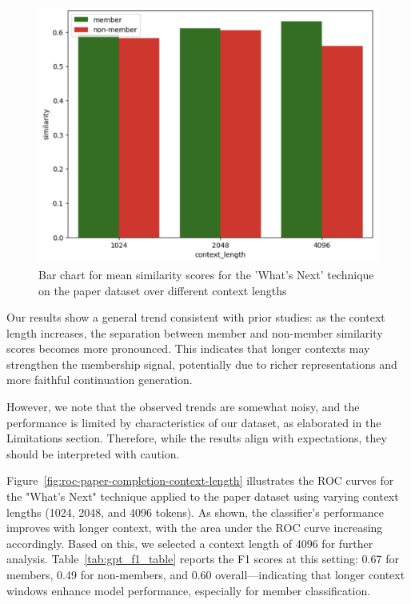 \documentclass[sigconf]{acmart}
\begin{document}
\begin{figure}[htp]
  \centering
  \includegraphics[width=\columnwidth]{figures/paper-completion-context-length-bar.png}
    \caption{Bar chart for mean similarity scores for the 'What's Next'  technique on the paper dataset over different context lengths}
    \label{fig:paper-completion-context-length-bar}
\end{figure}

Our results show a general trend consistent with prior studies: as the context length increases, the separation between member and non-member similarity scores becomes more pronounced. This indicates that longer contexts may strengthen the membership signal, potentially due to richer representations and more faithful continuation generation.

However, we note that the observed trends are somewhat noisy, and the performance is limited by characteristics of our dataset, as elaborated in the Limitations section. Therefore, while the results align with expectations, they should be interpreted with caution.

Figure~\ref{fig:roc-paper-completion-context-length} illustrates the ROC curves for the "What’s Next" technique applied to the paper dataset using varying context lengths (1024, 2048, and 4096 tokens). As shown, the classifier's performance improves with longer context, with the area under the ROC curve increasing accordingly. Based on this, we selected a context length of 4096 for further analysis. Table~\ref{tab:gpt_f1_table} reports the F1 scores at this setting: 0.67 for members, 0.49 for non-members, and 0.60 overall—indicating that longer context windows enhance model performance, especially for member classification.
\end{document}
